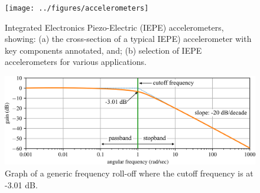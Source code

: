 \documentclass[12pt,letter]{article}
\begin{document}
\begin{figure}[H]
    \centering
    \texttt{[image: ../figures/accelerometers]}
    \caption{Integrated Electronics Piezo-Electric (IEPE) accelerometers, showing: (a) the cross-section of a typical IEPE) accelerometer with key components annotated, and; (b) selection of IEPE accelerometers for various applications.}
    \label{fig:accelerometers}
\end{figure} 

\begin{table}[H]
\caption{Specifications for various IEPE accelerometers.}
\label{table:accelerometers}
\end{table}




\begin{figure}[H]
	\centering
	\includegraphics[width=6.198in]{../figures/frequency_rolloff}
	\caption{Graph of a generic frequency roll-off where the cutoff frequency is at -3.01 dB\protect\footnotemark[1].}
	\label{fig:frequency_rolloff}
\end{figure}
\end{document}
